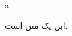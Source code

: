 \documentclass{report}
\begin{document}
\begin{center}
{\besmc a}
\end{center}
\clearpage
این یک متن است. 
\end{document}
